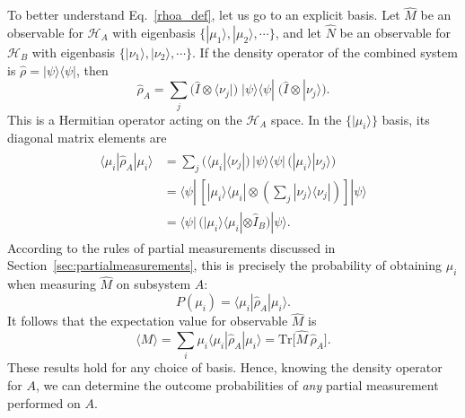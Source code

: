 \documentclass[pra,12pt]{revtex4}
\begin{document}
To better understand Eq.~\eqref{rhoa_def}, let us go to an explicit
basis.  Let $\hat{M}$ be an observable for $\mathscr{H}_A$ with
eigenbasis $\{|\mu_1\rangle, |\mu_2\rangle,\cdots\}$, and let
$\hat{N}$ be an observable for $\mathscr{H}_B$ with eigenbasis
$\{|\nu_1\rangle, |\nu_2\rangle,\cdots\}$.  If the density operator of
the combined system is $\hat{\rho} = |\psi\rangle\langle \psi|$, then
\begin{equation}
  \hat{\rho}_A =
    \sum_j
    \Big( \hat{I}\otimes \langle \nu_j| \Big)
    \; |\psi\rangle \langle \psi | \;
    \Big( \hat{I}\otimes | \nu_j\rangle \Big).
    \label{rhoa_explicit}
\end{equation}
This is a Hermitian operator acting on the $\mathscr{H}_A$ space.  In
the $\{|\mu_i\rangle\}$ basis, its diagonal matrix elements are
\begin{align}
  \begin{aligned}
    \langle \mu_i | \hat{\rho}_A | \mu_i \rangle
    &=
    \sum_j
    \Big( \langle \mu_i| \langle \nu_j| \Big)
    \, |\psi\rangle \langle \psi | \,
    \Big( |\mu_i\rangle | \nu_j\rangle \Big) \\
    &=
    \langle \psi | \,
    \left[ |\mu_i\rangle \langle \mu_i| \otimes
      \left(\sum_j | \nu_j\rangle \langle \nu_j|\right) \right]
    |\psi\rangle \\
    &=
    \langle \psi | \,
    \Big( |\mu_i\rangle \langle \mu_i| \otimes \hat{I}_B\Big) |\psi\rangle.
  \end{aligned}
\end{align}
According to the rules of partial measurements discussed in
Section~\ref{sec:partialmeasurements}, this is precisely the
probability of obtaining $\mu_i$ when measuring $\hat{M}$ on subsystem
$A$:
\begin{equation}
  P(\mu_i) = \langle \mu_i | \hat{\rho}_A | \mu_i \rangle.
  \label{rho_prob}
\end{equation}
It follows that the expectation value for observable $\hat{M}$ is
\begin{equation}
  \langle M \rangle = \sum_i \mu_i
  \langle \mu_i | \hat{\rho}_A | \mu_i \rangle
  = \mathrm{Tr}\Big[\hat{M}\, \hat{\rho}_A \Big].
  \label{rho_expect}
\end{equation}
These results hold for any choice of basis.  Hence, knowing the
density operator for $A$, we can determine the outcome probabilities
of \textit{any} partial measurement performed on $A$.
\end{document}
